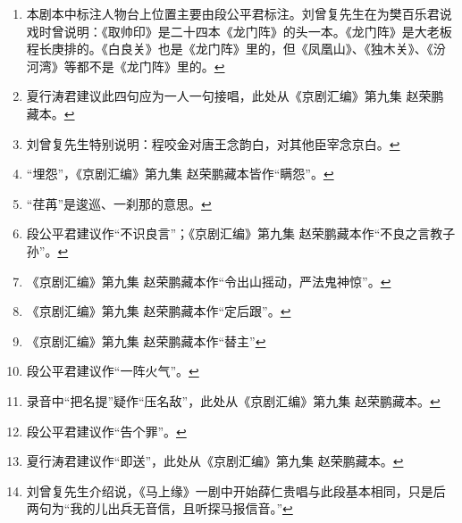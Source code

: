 \begin{enumerate}
\item
  \leavevmode\hypertarget{fn337}{}%
  本剧本中标注人物台上位置主要由段公平君标注。刘曾复先生在为樊百乐君说戏时曾说明：《取帅印》是二十四本《龙门阵》的头一本。《龙门阵》是大老板程长庚排的。《白良关》也是《龙门阵》里的，但《凤凰山》、《独木关》、《汾河湾》等都不是《龙门阵》里的。\protect\hyperlink{fnref337}{↩}
\item
  \leavevmode\hypertarget{fn338}{}%
  夏行涛君建议此四句应为一人一句接唱，此处从《京剧汇编》第九集
  赵荣鹏藏本。\protect\hyperlink{fnref338}{↩}
\item
  \leavevmode\hypertarget{fn339}{}%
  刘曾复先生特别说明：程咬金对唐王念韵白，对其他臣宰念京白。\protect\hyperlink{fnref339}{↩}
\item
  \leavevmode\hypertarget{fn340}{}%
  ``埋怨''，《京剧汇编》第九集
  赵荣鹏藏本皆作``瞒怨''。\protect\hyperlink{fnref340}{↩}
\item
  \leavevmode\hypertarget{fn341}{}%
  ``荏苒''是逡巡、一刹那的意思。\protect\hyperlink{fnref341}{↩}
\item
  \leavevmode\hypertarget{fn342}{}%
  段公平君建议作``不识良言''；《京剧汇编》第九集
  赵荣鹏藏本作``不良之言教子孙''。\protect\hyperlink{fnref342}{↩}
\item
  \leavevmode\hypertarget{fn343}{}%
  《京剧汇编》第九集
  赵荣鹏藏本作``令出山摇动，严法鬼神惊''。\protect\hyperlink{fnref343}{↩}
\item
  \leavevmode\hypertarget{fn344}{}%
  《京剧汇编》第九集
  赵荣鹏藏本作``定后跟''。\protect\hyperlink{fnref344}{↩}
\item
  \leavevmode\hypertarget{fn345}{}%
  《京剧汇编》第九集 赵荣鹏藏本作``替主''\protect\hyperlink{fnref345}{↩}
\item
  \leavevmode\hypertarget{fn346}{}%
  段公平君建议作``一阵火气''。\protect\hyperlink{fnref346}{↩}
\item
  \leavevmode\hypertarget{fn347}{}%
  录音中``把名提''疑作``压名敌''，此处从《京剧汇编》第九集
  赵荣鹏藏本。\protect\hyperlink{fnref347}{↩}
\item
  \leavevmode\hypertarget{fn348}{}%
  段公平君建议作``告个罪''。\protect\hyperlink{fnref348}{↩}
\item
  \leavevmode\hypertarget{fn349}{}%
  夏行涛君建议作``即送''，此处从《京剧汇编》第九集
  赵荣鹏藏本。\protect\hyperlink{fnref349}{↩}
\item
  \leavevmode\hypertarget{fn350}{}%
  刘曾复先生介绍说，《马上缘》一剧中开始薛仁贵唱与此段基本相同，只是后两句为``我的儿出兵无音信，且听探马报信音。''\protect\hyperlink{fnref350}{↩}

\end{enumerate}
